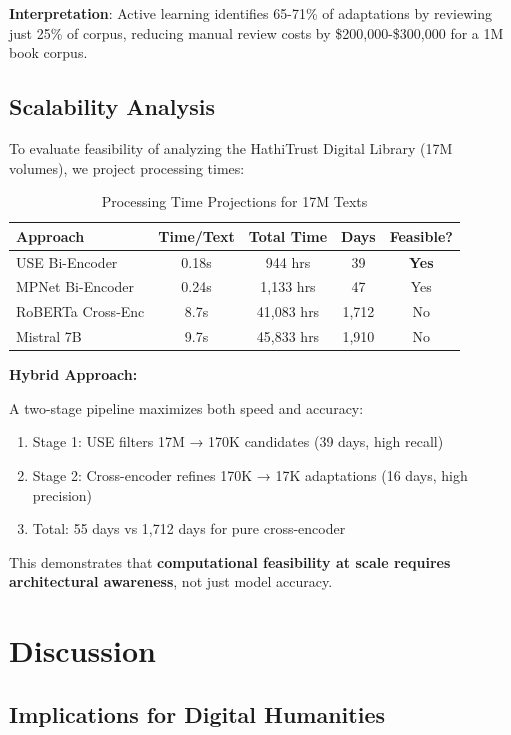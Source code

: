 \documentclass[12pt,a4paper]{article}
\begin{document}
\textbf{Interpretation}: Active learning identifies 65-71\% of adaptations by reviewing just 25\% of corpus, reducing manual review costs by \$200,000-\$300,000 for a 1M book corpus.

\subsection{Scalability Analysis}

To evaluate feasibility of analyzing the HathiTrust Digital Library (17M volumes), we project processing times:

\begin{table}[h]
\centering
\caption{Processing Time Projections for 17M Texts}
\begin{tabular}{lcccc}
\toprule
\textbf{Approach} & \textbf{Time/Text} & \textbf{Total Time} & \textbf{Days} & \textbf{Feasible?} \\
\midrule
USE Bi-Encoder & 0.18s & 944 hrs & 39 & \textbf{Yes} \\
MPNet Bi-Encoder & 0.24s & 1,133 hrs & 47 & Yes \\
RoBERTa Cross-Enc & 8.7s & 41,083 hrs & 1,712 & No \\
Mistral 7B & 9.7s & 45,833 hrs & 1,910 & No \\
\bottomrule
\end{tabular}
\end{table}

\textbf{Hybrid Approach:}

A two-stage pipeline maximizes both speed and accuracy:
\begin{enumerate}
    \item Stage 1: USE filters 17M → 170K candidates (39 days, high recall)
    \item Stage 2: Cross-encoder refines 170K → 17K adaptations (16 days, high precision)
    \item Total: 55 days vs 1,712 days for pure cross-encoder
\end{enumerate}

This demonstrates that \textbf{computational feasibility at scale requires architectural awareness}, not just model accuracy.

\section{Discussion}

\subsection{Implications for Digital Humanities}
\end{document}
